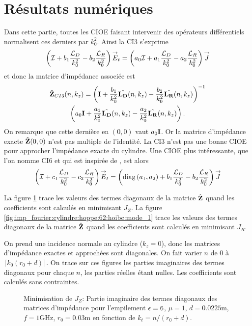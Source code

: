 \section{Résultats numériques}

  Dans cette partie, toutes les CIOE faisant intervenir des opérateurs différentiels normalisent ces derniers par \(k_0^2\). Ainsi la CI3 s'exprime  
  \begin{equation*}
    \left({\mathcal{I}} + b_1\dfrac{{\mathcal{L}_D}}{k_0^2} -b_2\dfrac{{\mathcal{L}_R}}{k_0^2}\right){\overset{\rightarrow}{E}}_t = \left(a_0{\mathcal{I}} + a_1\dfrac{{\mathcal{L}_D}}{k_0^2} - a_2 \dfrac{{\mathcal{L}_R}}{k_0^2} \right){\overset{\rightarrow}{J}}
  \end{equation*}
  et donc la matrice d'impédance associée est
  \begin{multline*}
    \hat{\mathbf{Z}}_{CI3}(n,k_z) = \left(\mathbf{I} + \dfrac{b_1}{k_0^2}\hat{\mathbf{L_D}}(n,k_z)- \dfrac{b_2}{k_0^2}\hat{\mathbf{L_R}}(n,k_z)\right)^{-1}
    \\
    \left(a_0\mathbf{I} + \dfrac{a_1}{k_0^2}\hat{\mathbf{L_D}}(n,k_z)- \dfrac{a_2}{k_0^2}\hat{\mathbf{L_R}}(n,k_z)\right).
  \end{multline*}
  On remarque que cette dernière en \((0,0)\) vaut \(a_0\mathbf{I}\).
  Or la matrice d'impédance exacte \(\hat{\mathbf{Z}}(0,0)\) n'est pas multiple de l'identité.
  La CI3 n'est pas une bonne CIOE pour approcher l'impédance exacte du cylindre.
  Une CIOE plus intéressante, que l'on nomme CI6 et qui est inspirée de \cite[p.~60]{hoppe_impedance_1995}, est alors
  \begin{equation*}
    \left({\mathcal{I}} + c_1\dfrac{{\mathcal{L}_D}}{k_0^2} -c_2\dfrac{{\mathcal{L}_R}}{k_0^2}\right){\overset{\rightarrow}{E}}_t = \left(\operatorname{diag}\left(a_1,a_2\right) + b_1\dfrac{{\mathcal{L}_D}}{k_0^2} - b_2 \dfrac{{\mathcal{L}_R}}{k_0^2} \right){\overset{\rightarrow}{J}}
  \end{equation*}

  La figure \ref{fig:imp_fourier:cylindre:hoppe:62:hoibc:mode_2} trace les valeurs des termes diagonaux de la matrice \(\hat{\mathbf{Z}}\) quand les coefficients sont calculés en minimisant \(J_Z\).
  La figure \ref{fig:imp_fourier:cylindre:hoppe:62:hoibc:mode_1} trace les valeurs des termes diagonaux de la matrice \(\hat{\mathbf{Z}}\) quand les coefficients sont calculés en minimisant \(J_R\).

  On prend une incidence normale au cylindre (\(k_z=0\)), donc les matrices d'impédance exactes et approchées sont diagonales.
  On fait varier \(n\) de 0 à \(\lceil k_0 (r_0+d) \rceil\). On trace sur ces figures les parties imaginaires des termes diagonaux pour chaque \(n\), les parties réelles étant nulles.
  Les coefficients sont calculés sans contraintes.

  \begin{figure}[!hbt]
    \centering
    
    \caption[CIOE sur empilement de Hoppe & Rahmat-Samii p.~62]{Minimisation de \(J_Z\): Partie imaginaire des termes diagonaux des matrices d'impédance pour l'empilement \(\epsilon = 6\), \(\mu = 1\), \(d=0.0225\text{m}\), \(f=1\text{GHz}\), \(r_0=0.03\text{m}\) en fonction de \(k_t = n / (r_0+d)\).}
    \label{fig:imp_fourier:cylindre:hoppe:62:hoibc:mode_2}
  \end{figure}

